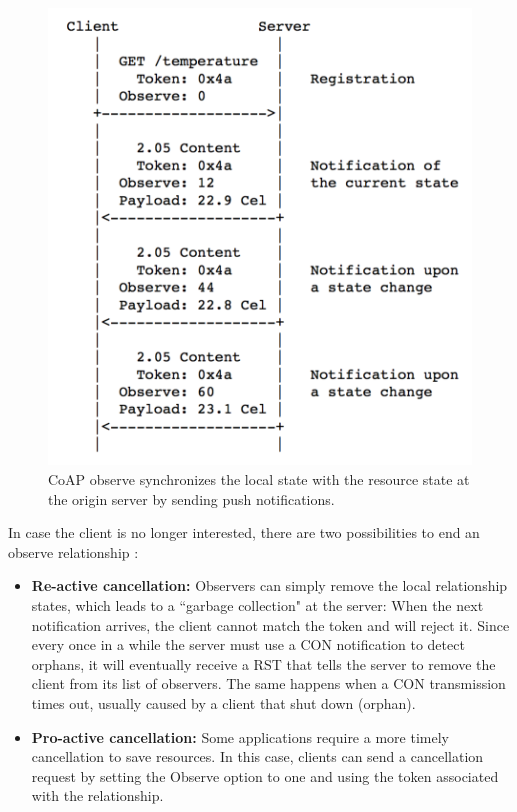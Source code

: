 \begin{figure}[!htbp]
\centering
\includegraphics[scale = 0.55]{coap_observe.png}
\caption[CoAP observe synchronization]{CoAP observe synchronizes the local state with the resource state at the origin server by sending push notifications. \cite{coap_observe}}
\label{fig:coap_observe}
\end{figure}

In case the client is no longer interested, there are two possibilities to end an observe relationship \cite{kovatsch2015scalable}:

\begin{itemize}

\item \textbf{Re-active cancellation:} Observers can simply remove the local relationship states, which leads to a ``garbage collection" at the server: When the next notification arrives, the client cannot match the token and will reject it. Since every once in a while the server must use a CON notification to detect orphans, it will eventually receive a RST that tells the server to remove the client from its list of observers. The same happens when a CON transmission times out, usually caused by a client that shut down (orphan).

\item \textbf{Pro-active cancellation:} Some applications require a more timely cancellation to save resources. In this case, clients can send a cancellation request by setting the Observe option to one and using the token associated with the relationship.

\end{itemize}

